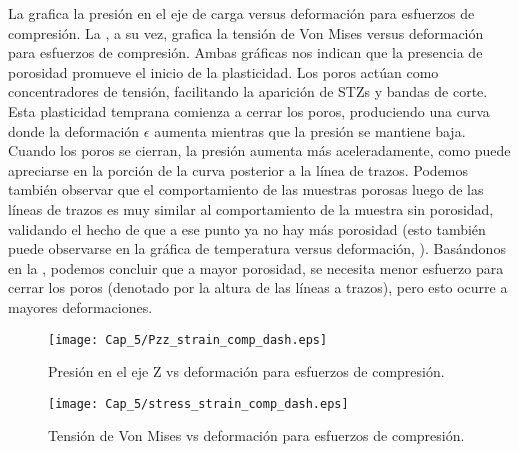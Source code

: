 
La  grafica la presión en el eje de carga versus deformación para esfuerzos de compresión. La ,
a su vez, grafica la tensión de Von Mises versus deformación para esfuerzos de compresión.
Ambas gráficas nos indican que la presencia de porosidad promueve el inicio de la plasticidad. Los poros actúan como concentradores de tensión,
facilitando la aparición de STZs y bandas de corte. Esta plasticidad temprana comienza a
cerrar los poros, produciendo una curva donde la deformación $\epsilon$ aumenta mientras que la presión se mantiene baja.
Cuando los poros se cierran, la presión aumenta más aceleradamente, como puede apreciarse en la porción de la curva posterior
a la línea de trazos. Podemos también observar que el comportamiento de las muestras porosas luego de las líneas de trazos es
muy similar al comportamiento de la muestra sin porosidad, validando el hecho de que a ese punto ya no hay más porosidad (esto también puede observarse en la gráfica de temperatura versus deformación, ). Basándonos en la , podemos concluir que a mayor porosidad, se necesita menor esfuerzo para cerrar los poros (denotado por la altura de las líneas a trazos), pero esto ocurre a mayores deformaciones.

\begin{figure}[H]
  \centering
	\texttt{[image: Cap\_5/Pzz\_strain\_comp\_dash.eps]}
	\caption[Presión en el eje Z vs deformación para esfuerzos de compresión]{Presión en el eje Z vs deformación para esfuerzos de compresión.}
	\label{C5:fg:PzzComp}
\end{figure}

\begin{figure}[H]
  \centering
	\texttt{[image: Cap\_5/stress\_strain\_comp\_dash.eps]}
	\caption[Tensión de Von Mises vs deformación para esfuerzos de compresión]{Tensión de Von Mises vs deformación para esfuerzos de compresión.}
	\label{C5:fg:stressComp}
\end{figure}

